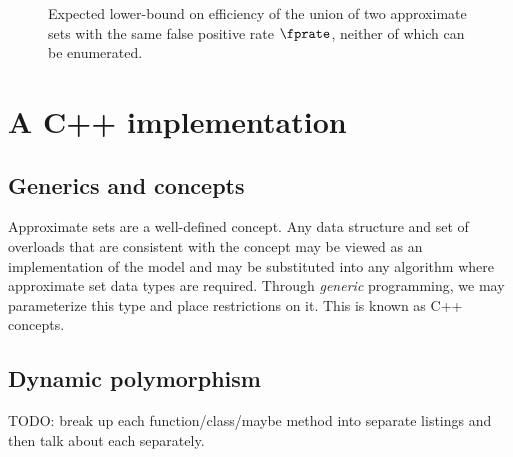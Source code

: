 \documentclass[ ../main.tex]{subfiles}
\begin{document}
\begin{figure}
\centering
\caption{Expected lower-bound on efficiency of the union of two approximate sets with the same false positive rate $\fprate$, neither of which can be enumerated.}
\label{fig:cor_union_same_fprate}
\end{figure}








\chapter{A C++ implementation}
\label{sec:impl}
\section{Generics and concepts}
Approximate sets are a well-defined concept. Any data structure and set of 
overloads that are consistent with the concept may be viewed as an 
implementation of the model and may be substituted into any algorithm where 
approximate set data types are required. Through \emph{generic} programming, we 
may parameterize this type and place restrictions on it. This is known as C++ 
concepts.

\section{Dynamic polymorphism}
TODO: break up each function/class/maybe method into separate listings and then
talk about each separately.
\end{document}
